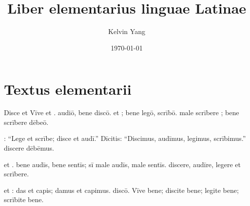 \documentclass[12pt]{nextbook}
\title{Liber elementarius linguae Latinae}
\author{Kelvin Yang}
\date{\today}
\begin{document}
\frontmatter
\maketitle
\tableofcontents
\mainmatter
\chapter{Textus elementarii}
\begin{readersection}{Disce et Vīve}
 et .  audiō, bene discō.  et ; bene legō,   scrībō.  male scrībere ; bene scrībere dēbeō.

: “Lege et scrībe; disce et audī.” Dīcitis: “Discimus, audīmus, legimus, scrībimus.”  discere dēbēmus.

 et .  bene audīs, bene sentīs; sī male audīs, male sentīs.  discere, audīre, legere et scrībere.

 et : das et capis; damus et capimus.  discō. Vīve bene; discite bene; legite bene; scrībite bene.
\end{readersection}
\end{document}
